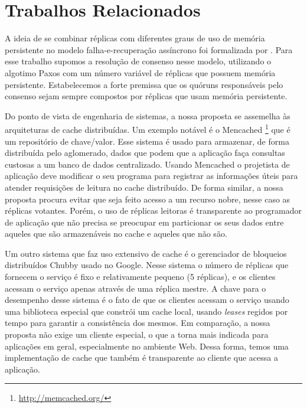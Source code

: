 \section{Trabalhos Relacionados}\label{sec:trabalhos-relacionados}

A ideia de se combinar réplicas com diferentes graus de uso de memória persistente no
modelo falha-e-recuperação assíncrono foi formalizada por . Para
esse trabalho supomos a resolução de consenso nesse modelo, utilizando o algotimo Paxos
com um número variável de réplicas que possuem memória persistente. Estabelecemos a forte
premissa que os quóruns responsáveis pelo consenso sejam sempre compostos por réplicas que
usam memória persistente.

Do ponto de vista de engenharia de sistemas, a nossa proposta se assemelha às arquiteturas
de cache distribuídas. Um exemplo notável é o Mencached
\footnote{\url{http://memcached.org/}} que é um repositório de chave/valor. Esse sistema é
usado para armazenar, de forma distribuída pelo aglomerado, dados que podem que a
aplicação faça consultas custosas a um banco de dados centralizado. Usando Mencached o
projetista de aplicação deve modificar o seu programa para registrar as informações úteis
para atender requisições de leitura no cache distribuído. De forma similar, a nossa
proposta procura evitar que seja feito acesso a um recurso nobre, nesse caso as réplicas
votantes. Porém, o uso de réplicas leitoras é transparente ao programador de aplicação que
não precisa se preocupar em particionar os seus dados entre aqueles que são armazenáveis
no cache e aqueles que não são.

Um outro sistema que faz uso extensivo de cache é o gerenciador de bloqueios distribuídos
Chubby \cite{burrows06} usado no Google. Nesse sistema o número de réplicas que fornecem o
serviço é fixo e relativamente pequeno (5 réplicas), e os clientes acessam o serviço
apenas através de uma réplica mestre. A chave para o desempenho desse sistema é o fato de
que os clientes acessam o serviço usando uma biblioteca especial que constrói um cache
local, usando \emph{leases} regidos por tempo \cite{lampson96} para garantir a
consistência dos mesmos. Em comparação, a nossa proposta não exige um cliente especial, o
que a torna mais indicada para aplicações em geral, especialmente no ambiente Web. Dessa
forma, temos uma implementação de cache que também é transparente ao cliente que acessa a
aplicação.

